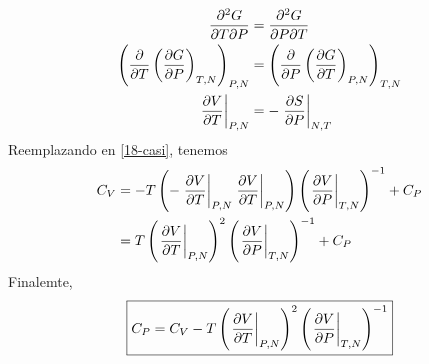 \begin{sol}
\begin{enumerate}
\begin{align}
  \pdv{G}{T}{P}&=\pdv{G}{P}{T}\\
  \left(\pdv{T}\left(\pdv{G}{P}\right)_{T,N}\right)_{P,N}&=\left(\pdv{P}\left(\pdv{G}{T}\right)_{P,N}\right)_{T,N}\\
  \eval{\pdv{V}{T}}_{P,N}&=-\eval{\pdv{S}{P}}_{N,T}
\end{align}
Reemplazando en \eqref{18-casi}, tenemos
\begin{align}
  C_V&=-T\left(-\eval{\pdv{V}{T}}_{P,N}\eval{\pdv{V}{T}}_{P,N}\right)\left(\eval{\pdv{V}{P}}_{T,N}\right)^{-1}+C_P\\
  &=T\left(\eval{\pdv{V}{T}}_{P,N}\right)^2\left(\eval{\pdv{V}{P}}_{T,N}\right)^{-1}+C_P
\end{align}
Finalemte,
\begin{equation}
\boxed{  C_P=C_V-T\left(\eval{\pdv{V}{T}}_{P,N}\right)^2\left(\eval{\pdv{V}{P}}_{T,N}\right)^{-1}}
\end{equation}
















\end{enumerate}
\end{sol}